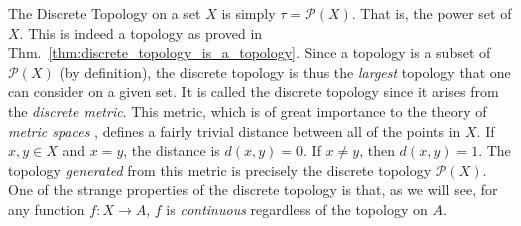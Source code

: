     \begin{example}
        The Discrete Topology
        on a set $X$ is simply $\tau=\mathcal{P}(X)$. That is, the
        \gls{power set} of $X$. This is indeed a topology as
        proved in Thm.~\ref{thm:discrete_topology_is_a_topology}. Since a
        topology is a subset of $\mathcal{P}(X)$ (by definition), the discrete
        topology is thus the \textit{largest} topology that one can consider on
        a given set. It is called the discrete topology since it arises from the
        \textit{discrete metric}. This metric, which is
        of great importance to the theory of \textit{metric spaces}%
        , defines a fairly trivial distance between all of
        the points in $X$. If $x,y\in{X}$ and $x=y$, the distance is
        $d(x,y)=0$. If $x\ne{y}$, then $d(x,y)=1$. The topology
        \textit{generated} from this metric
        is precisely the discrete topology $\mathcal{P}(X)$. One of the strange
        properties of the discrete topology is that, as we will see, for any
        function $f:X\rightarrow{A}$, $f$ is \textit{continuous}%
        regardless of the topology on $A$.
    \end{example}
